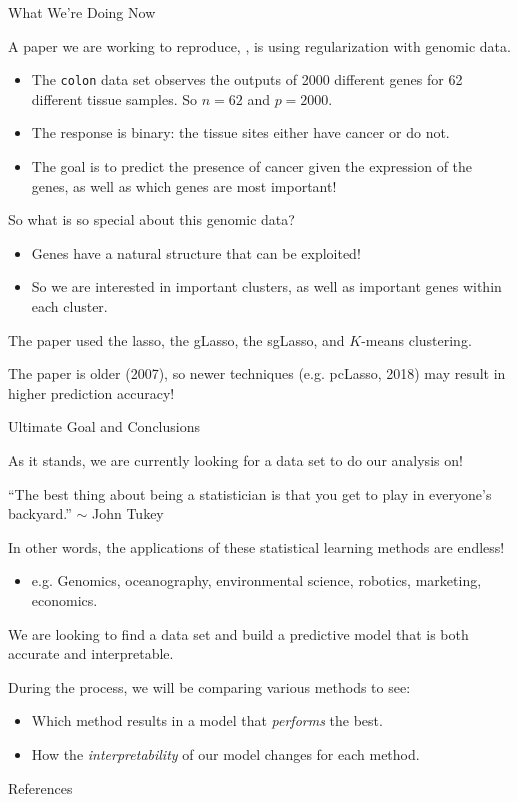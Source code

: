\documentclass[8pt]{beamer}
\begin{document}
\begin{frame}{What We're Doing Now}

A paper we are working to reproduce, \cite{ma2007supervised}, is using regularization with genomic data. %
\begin{itemize}
    \item The {\color{SteelBlue4} \texttt{colon}} data set observes the outputs of 2000 different genes for 62 different tissue samples. So $n=62$ and $p=2000$. %
    \item The response is binary: the tissue sites either have cancer or do not. %
    \item The goal is to predict the presence of cancer given the expression of the genes, as well as which genes are most important! %
\end{itemize}

So what is so special about this genomic data? %
\begin{itemize}
    \item Genes have a natural structure that can be exploited! %
    \item So we are interested in important clusters, as well as important genes within each cluster. %
\end{itemize}

The paper used the lasso, the gLasso, the sgLasso, and $K$-means clustering. %

The paper is older (2007), so newer techniques (e.g. pcLasso, 2018) may result in higher prediction accuracy! 
    
\end{frame}

\begin{frame}{Ultimate Goal and Conclusions}

As it stands, we are currently looking for a data set to do our analysis on! %
\Sadey[1.25][yellow] %

``The best thing about being a statistician is that you get to play in everyone's backyard.''
\hfill $\sim$ John Tukey \hspace{0.4cm} %

In other words, the applications of these statistical learning methods are endless! %
\begin{itemize}
    \item e.g. Genomics, oceanography, environmental science, robotics, marketing, economics. %
\end{itemize}

We are looking to find a data set and build a predictive model that is both accurate and interpretable. %

During the process, we will be comparing various methods to see: %
\begin{itemize}
    \item Which method results in a model that \textit{performs} the best. %
    \item How the \textit{interpretability} of our model changes for each method. %
\end{itemize}
    
\end{frame}


\begin{frame}[allowframebreaks]{References}



    
\end{frame}
\end{document}
